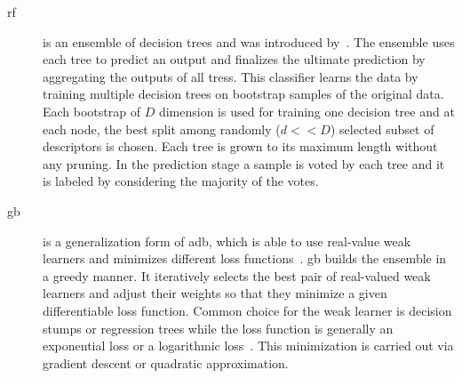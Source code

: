 \begin{description}
\item[\acf*{rf}] is an ensemble of decision trees and was introduced by~\cite{breiman2001random}.
The ensemble uses each tree to predict an output and finalizes the ultimate prediction by aggregating the outputs of all tress. 
This classifier learns the data by training multiple decision trees on bootstrap samples of the original data. 
Each bootstrap of $D$ dimension is used for training one decision tree and at each node, the best split among randomly ($d << D$) selected subset of descriptors is chosen. 
Each tree is grown to its maximum length without any pruning. 
In the prediction stage a sample is voted by each tree and it is labeled by considering the majority of the votes.\\

\item[\acf*{gb}] is a generalization form of \ac{adb}, which is able to use real-value weak learners and minimizes different loss functions~\cite{zheng2007general}.
\ac{gb} builds the ensemble in a greedy manner. 
It iteratively selects the best pair of real-valued weak learners and adjust their weights so that they minimize a given differentiable loss function.
Common choice for the weak learner is decision stumps or regression trees while the loss function is generally an exponential loss or a logarithmic loss~\cite{becker2013supervised}. 
This minimization is carried out via gradient descent or quadratic approximation.\\


\end{description}
